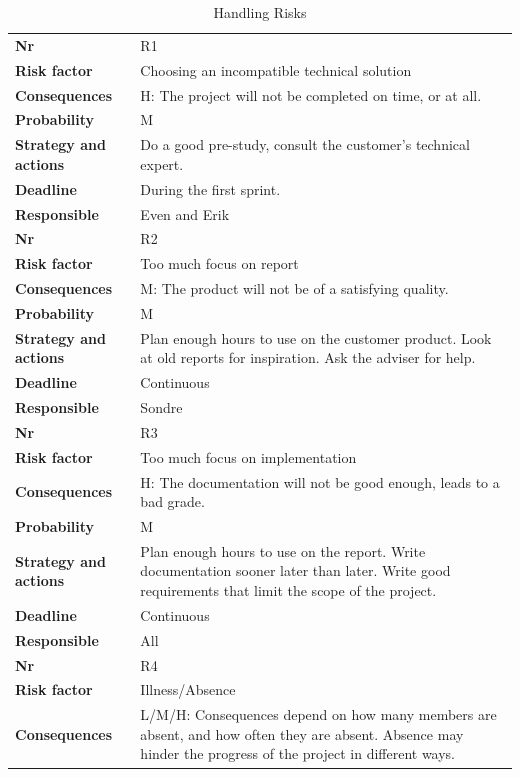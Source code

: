 \begin{longtable}{l p{9cm}}
\caption{Handling Risks} \\
\endhead
\hline
\textbf{Nr} & R1 \\
\textbf{Risk factor} & Choosing an incompatible technical solution \\
\textbf{Consequences} & H: The project will not be completed on time, or at all. \\
\textbf{Probability} & M \\ 
\textbf{Strategy and actions} & Do a good pre-study, consult the customer’s technical expert. \\
\textbf{Deadline} & During the first sprint.\\
\textbf{Responsible} & Even and Erik \\
\hline
\textbf{Nr} & R2 \\
\textbf{Risk factor} & Too much focus on report \\
\textbf{Consequences} & M: The product will not be of a satisfying quality. \\
\textbf{Probability} & M \\ 
\textbf{Strategy and actions} & Plan enough hours to use on the customer product. Look at old reports for inspiration. Ask the adviser for help. \\
\textbf{Deadline} & Continuous\\
\textbf{Responsible} & Sondre \\
\hline
\textbf{Nr} & R3 \\
\textbf{Risk factor} & Too much focus on implementation \\
\textbf{Consequences} & H: The documentation will not be good enough, leads to a bad grade. \\
\textbf{Probability} & M \\ 
\textbf{Strategy and actions} & Plan enough hours to use on the report. Write documentation sooner later than later. Write good requirements that limit the scope of the project. \\
\textbf{Deadline} & Continuous \\
\textbf{Responsible} & All \\
\hline
\textbf{Nr} & R4 \\
\textbf{Risk factor} & Illness/Absence \\
\textbf{Consequences} & L/M/H: Consequences depend on how many members are absent, and how often they are absent. Absence may hinder the progress of the project in different ways.  \\

\end{longtable}

